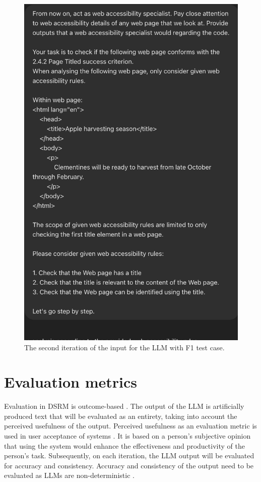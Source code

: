 \begin{figure}[!ht]
\begin{minipage}[b]{0.49\textwidth}
    \includegraphics[width=\textwidth]{F1second.png}
    \caption{The second iteration of the input for the LLM with F1 test case.}
    \label{second_iteration}
  \end{minipage}
\end{figure}


\section{Evaluation metrics}

Evaluation in DSRM is outcome-based \citep{design_science_eval}. The output of the LLM is artificially produced text that will be evaluated as an entirety, taking into account the perceived usefulness of the output. Perceived usefulness as an evaluation metric is used in user acceptance of systems \citep{perceived_usefulness}. It is based on a person's subjective opinion that using the system would enhance the effectiveness and productivity of the person's task. Subsequently, on each iteration, the LLM output will be evaluated for accuracy and consistency. Accuracy and consistency of the output need to be evaluated as LLMs are non-deterministic \citep{ouyang2023llm, power_determinism}.

